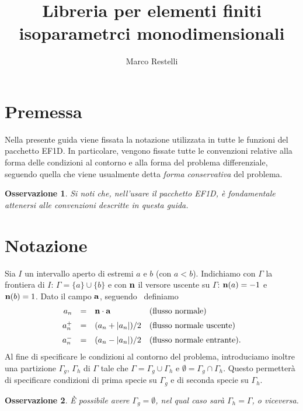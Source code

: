 \documentclass[11pt]{article}
\title{Libreria per elementi finiti isoparametrci monodimensionali}
\author{Marco Restelli}
\date{}
\newtheorem{remark}{Osservazione}[section]
\begin{document}
\maketitle

\section{Premessa}

Nella presente guida viene fissata la notazione utilizzata in tutte le
funzioni del pacchetto EF1D. In particolare, vengono fissate tutte le
convenzioni relative alla forma delle condizioni al contorno e alla
forma del problema differenziale, seguendo quella che viene usualmente
detta \emph{forma conservativa} del problema.

\begin{remark}
Si noti che, nell'usare il pacchetto EF1D, \`e fondamentale attenersi
alle convenzioni descritte in questa guida.
\end{remark}

\section{Notazione}

Sia $I$ un intervallo aperto di estremi $a$ e $b$ (con $a<b$).
Indichiamo con $\Gamma$ la frontiera di $I$: $\Gamma = \{a\}\cup\{b\}$
e con ${\bf n}$ il versore uscente su $\Gamma$: ${\bf n}(a)=-1$ e
${\bf n}(b)=1$. Dato il campo ${\bf a}$, seguendo~\cite{Hughes}
definiamo 
\[
\begin{array}{rcll}
a_n & = & {\bf n}\cdot{\bf a} & {\rm (flusso\,\,normale)} \\[2mm]
a_n^+ & = & (a_n+|a_n|)/2 & {\rm (flusso\,\,normale\,\,uscente)} \\[2mm]
a_n^- & = & (a_n-|a_n|)/2 & {\rm (flusso\,\,normale\,\,entrante)}.
\end{array}
\]
Al fine di specificare le condizioni al contorno del problema,
introduciamo inoltre una partizione $\Gamma_g$, $\Gamma_h$ di $\Gamma$
tale che $\Gamma = \Gamma_g \cup \Gamma_h$ e $\emptyset = \Gamma_g \cap
\Gamma_h$. Questo permetter\`a di specificare condizioni di prima
specie su $\Gamma_g$ e di seconda specie su $\Gamma_h$.

\begin{remark}
\`E possibile avere $\Gamma_g=\emptyset$, nel qual caso sar\`a
$\Gamma_h=\Gamma$, o viceversa.
\end{remark}
\end{document}
